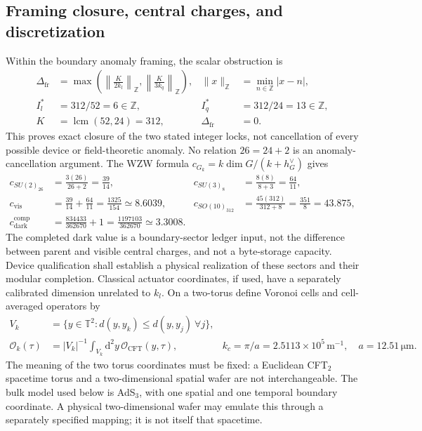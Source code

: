 \documentclass[11pt,a4paper]{article}
\newcommand{\dd}{\mathrm d}
\newcommand{\unit}[1]{\,\mathrm{#1}}
\begin{document}
\subsection{Framing closure, central charges, and discretization}
Within the boundary anomaly framing, the scalar obstruction is
\begin{align}
 \Delta_{\mathrm{fr}}&=\max\left(
 \left\|\frac{K}{2k_l}\right\|_{\mathbb Z},
 \left\|\frac{K}{3k_q}\right\|_{\mathbb Z}\right),
 &\|x\|_{\mathbb Z}&=\min_{n\in\mathbb Z}|x-n|,\\
 I_l^*&=312/52=6\in\mathbb Z,& I_q^*&=312/24=13\in\mathbb Z,\\
 K&=\operatorname{lcm}(52,24)=312,&\Delta_{\mathrm{fr}}&=0.
\end{align}
This proves exact closure of the two stated integer locks, not cancellation of every possible
device or field-theoretic anomaly. No relation $26=24+2$ is an anomaly-cancellation argument.
The WZW formula $c_{G_k}=k\dim G/(k+h_G^\vee)$ gives
\begin{align}
 c_{SU(2)_{26}}&=\frac{3(26)}{26+2}=\frac{39}{14},&
 c_{SU(3)_8}&=\frac{8(8)}{8+3}=\frac{64}{11},\\
 c_{\mathrm{vis}}&=\frac{39}{14}+\frac{64}{11}=\frac{1325}{154}
 \simeq8.6039,&c_{SO(10)_{312}}&=\frac{45(312)}{312+8}=\frac{351}{8}=43.875,\\
 c_{\mathrm{dark}}^{\mathrm{comp}}&=\frac{834433}{362670}+1
 =\frac{1197103}{362670}\simeq3.3008.&&
\end{align}
The completed dark value is a boundary-sector ledger input, not the difference between parent and visible
central charges, and not a byte-storage capacity. Device qualification shall establish
a physical realization of these sectors and their modular completion. Classical actuator coordinates, if used,
have a separately calibrated dimension unrelated to $k_l$.
On a two-torus define Voronoi cells and cell-averaged operators by
\begin{align}
 V_k&=\{y\in\mathbb T^2:d(y,y_k)\le d(y,y_j)\ \forall j\},\\
 \mathcal O_k(\tau)&=|V_k|^{-1}\int_{V_k}\dd^2y\,\mathcal O_{\mathrm{CFT}}(y,\tau),
 &k_c=\pi/a=2.5113\times10^5\unit{m^{-1}},\quad a=12.51\unit{\mu m}.
\end{align}
The meaning of the two torus coordinates must be fixed: a Euclidean CFT$_2$ spacetime torus
and a two-dimensional spatial wafer are not interchangeable. The bulk model used below is
AdS$_3$, with one spatial and one temporal boundary coordinate. A physical two-dimensional
wafer may emulate this through a separately specified mapping; it is not itself that spacetime.
\end{document}
